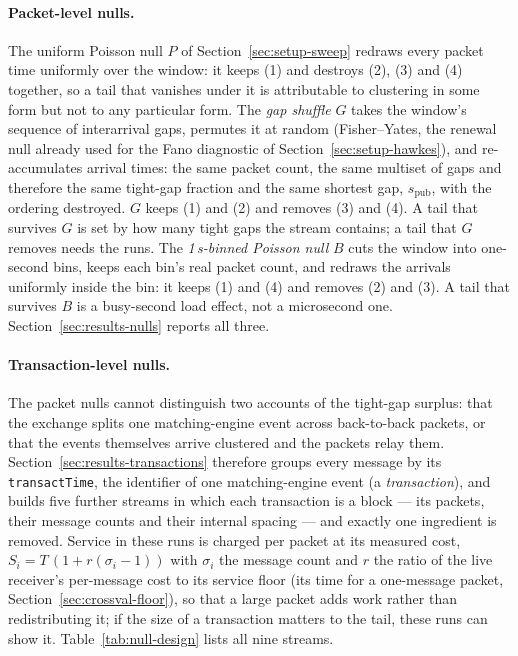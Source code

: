 \documentclass[11pt]{article}
\newcommand{\spub}{s_{\mathrm{pub}}}
\begin{document}
\paragraph{Packet-level nulls.} The uniform Poisson null $P$ of
Section~\ref{sec:setup-sweep} redraws every packet time uniformly over the window: it
keeps (1) and destroys (2), (3) and (4) together, so a tail that vanishes under it is
attributable to clustering in some form but not to any particular form. The \emph{gap
shuffle} $G$ takes the window's sequence of interarrival gaps, permutes it at random
(Fisher--Yates, the renewal null already used for the Fano diagnostic of
Section~\ref{sec:setup-hawkes}), and re-accumulates arrival times: the same packet count,
the same multiset of gaps and therefore the same tight-gap fraction and the same
shortest gap, $\spub$, with the ordering destroyed. $G$ keeps (1) and (2) and removes
(3) and (4). A tail that survives $G$ is set by how many tight gaps the stream contains; a
tail that $G$ removes needs the runs. The \emph{1\,s-binned Poisson null} $B$ cuts the window
into one-second bins, keeps each bin's real packet count, and redraws the arrivals
uniformly inside the bin: it keeps (1) and (4) and removes (2) and (3). A tail that
survives $B$ is a busy-second load effect, not a microsecond one. Section~\ref{sec:results-nulls}
reports all three.

\paragraph{Transaction-level nulls.} The packet nulls cannot distinguish two accounts
of the tight-gap surplus: that the exchange splits one matching-engine event across
back-to-back packets, or that the events themselves arrive clustered and the packets
relay them. Section~\ref{sec:results-transactions} therefore groups every message by its
\texttt{transactTime}, the identifier of one matching-engine event (a
\emph{transaction}), and builds five further streams in which each transaction is a
block --- its packets, their message counts and their internal spacing --- and exactly
one ingredient is removed. Service in these runs is charged per packet at its measured
cost, $S_i = T\,(1 + r(\sigma_i - 1))$ with $\sigma_i$ the message count and $r$ the ratio of the live receiver's per-message cost to its service floor (its time for a
one-message packet, Section~\ref{sec:crossval-floor}), so that a large packet adds work
rather than redistributing it; if the size of a transaction matters to the tail, these runs can show
it. Table~\ref{tab:null-design} lists all nine streams.
\end{document}
